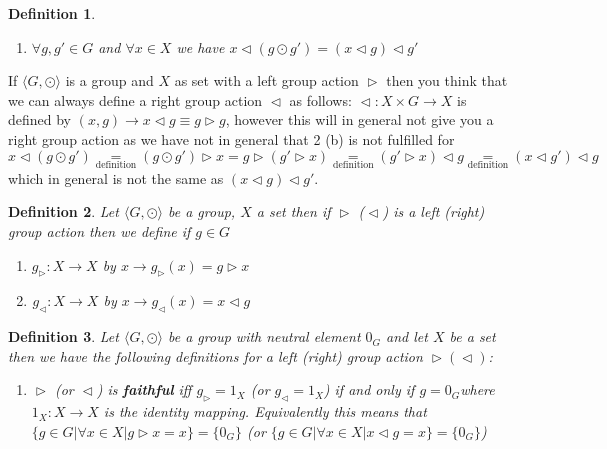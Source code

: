 \documentclass{book}
\newcommand{\equallim}{\mathop{=}\limits}
\newcommand{\tmop}[1]{\ensuremath{\operatorname{#1}}}
\newcommand{\tmstrong}[1]{\textbf{#1}}
\newtheorem{definition}{Definition}
{\theorembodyfont{\rmfamily}\newtheorem{example}{Example}}
\begin{document}
{{\begin{definition}
\begin{enumerate}
\begin{enumerate}
      \item $\forall g, g' \in G$ and $\forall x \in X$ we have $x
      \vartriangleleft (g \odot g') = (x \vartriangleleft g) \vartriangleleft
      g'$
    \end{enumerate}
  \end{enumerate}
\end{definition}

\begin{note}
  If $\langle G, \odot \rangle$ is a group and $X$ as set with a left group
  action $\vartriangleright$ then you think that we can always define a right
  group action $\vartriangleleft$ as follows: $\vartriangleleft : X \times G
  \rightarrow X$ is defined by $(x, g) \rightarrow x \vartriangleleft g \equiv
  g \vartriangleright g$, however this will in general not give you a right
  group action as we have not in general that 2 (b) is not fulfilled for $x
  \vartriangleleft (g \odot g') \equallim_{\tmop{definition}} (g \odot g')
  \vartriangleright x = g \vartriangleright (g' \vartriangleright x)
  \equallim_{\tmop{definition}} (g' \vartriangleright x) \vartriangleleft g
  \equallim_{\tmop{definition}} (x \vartriangleleft g') \vartriangleleft g$
  which in general is not the same as $(x \vartriangleleft g) \vartriangleleft
  g'$.
\end{note}

\begin{definition}
  Let $\langle G, \odot \rangle$ be a group, $X$ a set then if
  $\vartriangleright$ ($\vartriangleleft$) is a left (right) group action then
  we define if $g \in G$
  \begin{enumerate}
    \item $g_{\vartriangleright} : X \rightarrow X$ by $x \rightarrow
    g_{\vartriangleright} (x) = g \vartriangleright x$
    
    \item $_{} g_{\vartriangleleft} : X \rightarrow X$ by $x \rightarrow
    g_{\vartriangleleft} (x) = x \vartriangleleft g$
  \end{enumerate}
\end{definition}

\begin{definition}
  \label{faithful, trasitive action}{}{}Let $\langle G, \odot \rangle$ be a group
  with neutral element $0_G$ and let $X$ be a set then we have the following
  definitions for a left (right) group action $\vartriangleright
  (\vartriangleleft)$:
  \begin{enumerate}
    \item $\vartriangleright$ (or $\vartriangleleft$) is {\tmstrong{faithful}}
    iff $g_{\vartriangleright} = 1_X$ (or $g_{\vartriangleleft} = 1_X$) if and
    only if $g = 0_G$where $1_X : X \rightarrow X$ is the identity mapping.
    Equivalently this means that $\{ g \in G| \forall x \in X|g
    \vartriangleright x = x \} = \{ 0_G \}$ (or $\{ g \in G| \forall x \in X|x
    \vartriangleleft g = x \} = \{ 0_G \}$)
    

\end{enumerate}
\end{definition}}}
\end{document}
